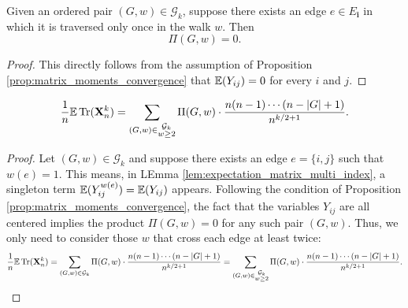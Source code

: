 \begin{lemma}
  \label{lem:Pi.prod_eq_zero_if_w_le_two}
  Given an ordered pair $(G,w) \in \mathcal{G}_k$, suppose there exists an edge $e \in E_\mathbf{i}$ in which it is traversed only once in the walk $w$. Then
  \[
  \Pi (G,w) = 0.
  \]
\end{lemma}
\begin{proof}
  This directly follows from the assumption of Proposition \ref{prop:matrix_moments_convergence} that $\mathbb{E} (Y_{ij}) = 0$ for every $i$ and $j$. 
\end{proof}
\begin{lemma}
  \label{lem:equation_4.8}
  \[
  \frac{1}{n} \mathbb{E} \operatorname{Tr} (\mathbf{X}_n^k) 
  = \sum_{(G,w) \in \substack{\mathcal{G}_k \\ w \geq 2}} \Pi (G,w) \cdot \frac{n (n-1) \cdots (n - |G| + 1)}{n^{k/2+1}}.
  \]
\end{lemma}
\begin{proof}
  Let $(G,w) \in \mathcal{G}_k$ and suppose there exists an edge $e = \{i,j\}$ such that $w(e) = 1$.
  This means, in LEmma \ref{lem:expectation_matrix_multi_index}, a singleton term $\mathbb{E} (Y_{ij}^{w(e)}) = \mathbb{E} (Y_{ij})$ appears.
  Following the condition of Proposition \ref{prop:matrix_moments_convergence}, the fact that the variables $Y_{ij}$ are all centered implies the product $\Pi (G,w) = 0$ for any such pair $(G,w)$.
  Thus, we only need to consider those $w$ that cross each edge at least twice: 
  \[
  \frac{1}{n} \mathbb{E} \operatorname{Tr} (\mathbf{X}_n^k) = \sum_{\substack{(G,w) \in \mathcal{G}_k}} \Pi (G,w) \cdot \frac{n (n-1) \cdots (n - |G| + 1)}{n^{k/2+1}}  = \sum_{(G,w) \in \substack{\mathcal{G}_k \\ w \geq 2}} \Pi (G,w) \cdot \frac{n (n-1) \cdots (n - |G| + 1)}{n^{k/2+1}}.
  \]
\end{proof}
